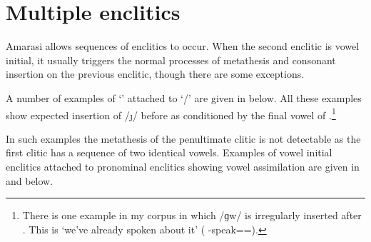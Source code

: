 \section{Multiple enclitics}\label{sec:ConInsConIns}
Amarasi allows sequences of enclitics to occur.
When the second enclitic is vowel initial,
it usually triggers the normal processes of metathesis
and consonant insertion on the previous enclitic,
though there are some exceptions.

A number of examples of  `{\een}'
attached to  `{\ee}/{\eeV}'
are given in  below.
All these examples show expected insertion of /\j/
before  as conditioned by the final vowel of .\footnote{
		There is one example in my corpus in which /ɡw/
		is irregularly inserted after . This is 
		`we've already spoken about it' ({\hai} \mi-speak={\ee=\een}).}

\begin{exe}
\end{exe}

In such examples the metathesis of the penultimate clitic
is not detectable as the first clitic has a sequence of two identical vowels.
Examples of vowel initial enclitics attached
to pronominal enclitics showing vowel assimilation are given in
 and  below.

